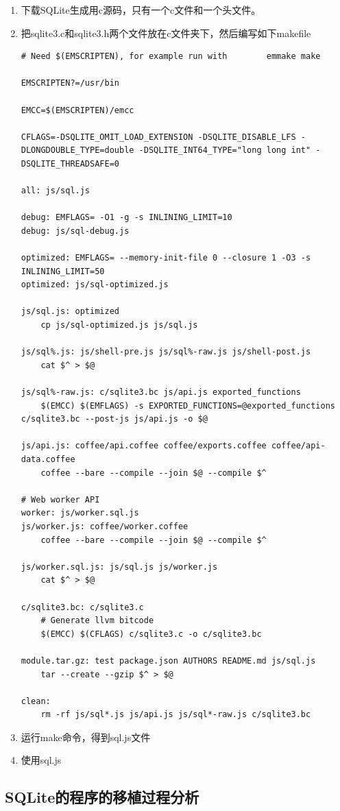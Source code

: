 \begin{enumerate}
    \item 下载SQLite生成用c源码，只有一个c文件和一个头文件。
    \item 把sqlite3.c和sqlite3.h两个文件放在c文件夹下，然后编写如下makefile
\begin{verbatim}
# Need $(EMSCRIPTEN), for example run with        emmake make

EMSCRIPTEN?=/usr/bin

EMCC=$(EMSCRIPTEN)/emcc

CFLAGS=-DSQLITE_OMIT_LOAD_EXTENSION -DSQLITE_DISABLE_LFS -DLONGDOUBLE_TYPE=double -DSQLITE_INT64_TYPE="long long int" -DSQLITE_THREADSAFE=0

all: js/sql.js

debug: EMFLAGS= -O1 -g -s INLINING_LIMIT=10 
debug: js/sql-debug.js

optimized: EMFLAGS= --memory-init-file 0 --closure 1 -O3 -s INLINING_LIMIT=50
optimized: js/sql-optimized.js

js/sql.js: optimized
	cp js/sql-optimized.js js/sql.js

js/sql%.js: js/shell-pre.js js/sql%-raw.js js/shell-post.js
	cat $^ > $@

js/sql%-raw.js: c/sqlite3.bc js/api.js exported_functions
	$(EMCC) $(EMFLAGS) -s EXPORTED_FUNCTIONS=@exported_functions c/sqlite3.bc --post-js js/api.js -o $@

js/api.js: coffee/api.coffee coffee/exports.coffee coffee/api-data.coffee
	coffee --bare --compile --join $@ --compile $^

# Web worker API
worker: js/worker.sql.js
js/worker.js: coffee/worker.coffee
	coffee --bare --compile --join $@ --compile $^

js/worker.sql.js: js/sql.js js/worker.js
	cat $^ > $@

c/sqlite3.bc: c/sqlite3.c
	# Generate llvm bitcode
	$(EMCC) $(CFLAGS) c/sqlite3.c -o c/sqlite3.bc

module.tar.gz: test package.json AUTHORS README.md js/sql.js
	tar --create --gzip $^ > $@

clean:
	rm -rf js/sql*.js js/api.js js/sql*-raw.js c/sqlite3.bc
\end{verbatim}    	
	\item 运行make命令，得到sql.js文件
	\item 使用sql.js
\end{enumerate}



\subsection{SQLite的程序的移植过程分析}

